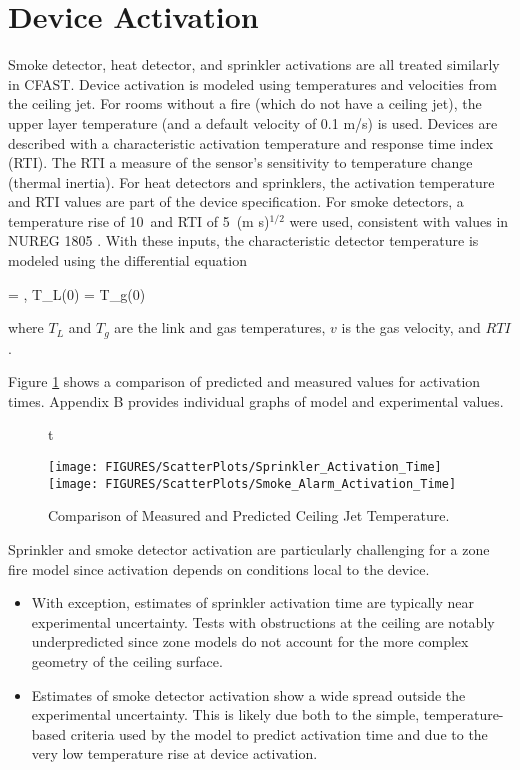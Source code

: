 \section{Device Activation}

Smoke detector, heat detector, and sprinkler activations are all treated similarly in CFAST.  Device activation is modeled using temperatures and velocities from the ceiling jet.  For rooms without a fire (which do not have a ceiling jet), the upper layer temperature (and a default velocity of 0.1 m/s) is used.  Devices are described with a characteristic activation temperature and response time index (RTI). The RTI a measure of the sensor's sensitivity to temperature change (thermal inertia). For heat detectors and sprinklers, the activation temperature and RTI values are part of the device specification. For smoke detectors, a temperature rise of 10~\degc and RTI of 5~(m s)$^{1/2}$ were used, consistent with values in NUREG 1805 \cite{NRCNUREG1805}. With these inputs, the characteristic detector temperature is modeled using the differential equation \cite{Heskestad:1976}

\be {} =   \; , \; T_L(0) = T_g(0)  \ee

where $T_L$ and $T_g$ are the link and gas temperatures, $v$ is the gas velocity, and $RTI$.

Figure \ref{fig:Activation_Scatter} shows a comparison of predicted and measured values for activation times. Appendix B provides individual graphs of model and experimental values.
\label{Smoke Detector Activation Time}
\label{Sprinkler Activation Time}

\begin{figure}{t}
\begin{center}
\texttt{[image: FIGURES/ScatterPlots/Sprinkler\_Activation\_Time]}  \\
\texttt{[image: FIGURES/ScatterPlots/Smoke\_Alarm\_Activation\_Time]}
\end{center}
\caption{Comparison of Measured and Predicted Ceiling Jet Temperature.} \label{fig:Activation_Scatter}
\end{figure}

Sprinkler and smoke detector activation are particularly challenging for a zone fire model since activation depends on conditions local to the device.
\begin{itemize}
\item With exception, estimates of sprinkler activation time are typically near experimental uncertainty. Tests with obstructions at the ceiling are notably underpredicted since zone models do not account for the more complex geometry of the ceiling surface.
\item Estimates of smoke detector activation show a wide spread outside the experimental uncertainty.  This is likely due both to the simple, temperature-based criteria used by the model to predict activation time and due to the very low temperature rise at device activation.
\end{itemize}




